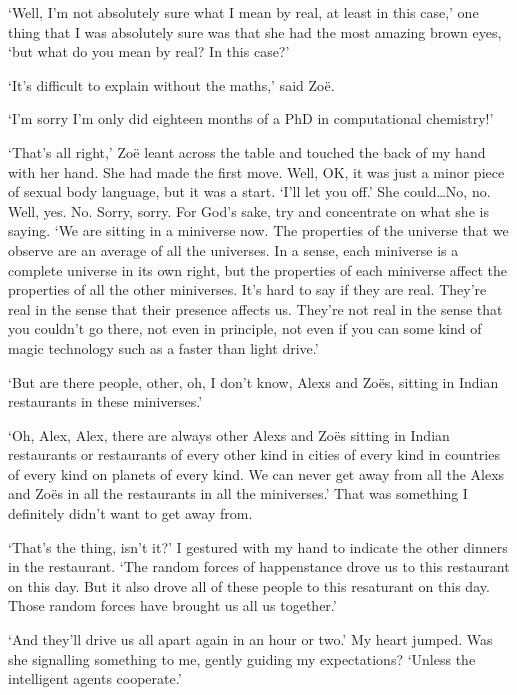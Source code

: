 `Well, I'm not absolutely sure what {\twelveit I\/} mean by real, at
least in this case,' one thing that I was absolutely sure was that
she had the most amazing brown eyes, `but what do {\twelveit you\/}
mean by real? In this case?'

`It's difficult to explain without the maths,' said Zo{\"e}.

`I'm sorry I'm only did eighteen months of a PhD in computational
chemistry!'

`That's all right,' Zo{\"e} leant across the table and touched the
back of my hand with her hand. She had made the first move. Well,
OK, it was just a minor piece of sexual body language, but it was a
start. `I'll let you off.' She could\dots No, no. Well, yes. No.
Sorry, sorry. For God's sake, {\twelveit try\/} and concentrate on
what she is saying. `We are sitting in a miniverse now. The
properties of the universe that we observe are an average of all the
universes. In a sense, each miniverse is a complete universe in its
own right, but the properties of each miniverse affect the
properties of all the other miniverses. It's hard to say if they are
real. They're real in the sense that their presence affects us.
They're not real in the sense that you couldn't go there, not even
in principle, not even if you can some kind of magic technology such
as a faster than light drive.'

`But are there people, other, oh, I don't know, Alexs and Zo{\"e}s,
sitting in Indian restaurants in these miniverses.'

`Oh, Alex, Alex, there are always other Alexs and Zo{\"e}s sitting
in Indian restaurants or restaurants of every other kind in cities
of every kind in countries of every kind on planets of every kind.
We can never get away from all the Alexs and Zo{\"e}s in all the
restaurants in all the miniverses.' That was something I definitely
didn't want to get away from.

`That's the thing, isn't it?' I gestured with my hand to indicate
the other dinners in the restaurant. `The random forces of
happenstance drove {\twelveit us\/} to {\twelveit this\/} restaurant
on {\twelveit this\/} day. But it also drove all of {\twelveit
these\/} people to this resaturant on this day. Those random forces
have brought us all us together.'

`And they'll drive us all apart again in an hour or two.' My heart
jumped. Was she signalling something to me, gently guiding my
expectations? `Unless the intelligent agents cooperate.'

